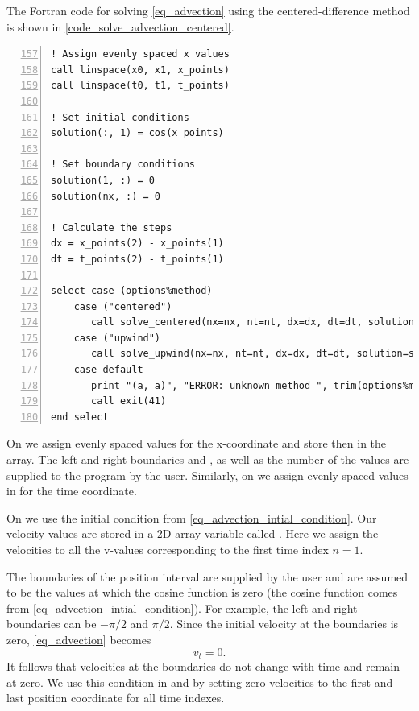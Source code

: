 The Fortran code for solving \autoref{eq_advection} using the centered-difference method is shown in \autoref{code_solve_advection_centered}.


\noindent\begin{minipage}{\linewidth}
\begin{lstlisting}[caption={Solving advection equation (\code{advection\_equation.f90}).},frame=tlrb,label={code_solve_advection_centered}, numbers=left, firstnumber=157]
! Assign evenly spaced x values
call linspace(x0, x1, x_points)
call linspace(t0, t1, t_points)

! Set initial conditions
solution(:, 1) = cos(x_points)

! Set boundary conditions
solution(1, :) = 0
solution(nx, :) = 0

! Calculate the steps
dx = x_points(2) - x_points(1)
dt = t_points(2) - t_points(1)

select case (options%method)
    case ("centered")
       call solve_centered(nx=nx, nt=nt, dx=dx, dt=dt, solution=solution)
    case ("upwind")
       call solve_upwind(nx=nx, nt=nt, dx=dx, dt=dt, solution=solution)
    case default
       print "(a, a)", "ERROR: unknown method ", trim(options%method)
       call exit(41)
end select
\end{lstlisting}
\end{minipage}

On  we assign evenly spaced values for the x-coordinate and store then in the  array. The left and right boundaries  and , as well as the number of the values  are supplied to the program by the user. Similarly, on  we assign evenly spaced values in  for the time coordinate.

On  we use the initial condition from \autoref{eq_advection_intial_condition}. Our velocity values are stored in a 2D array variable called . Here we assign the velocities to all the v-values corresponding to the first time index $n=1$.

The boundaries of the position interval are supplied by the user and are assumed to be the values at which the cosine function is zero (the cosine function comes from \autoref{eq_advection_intial_condition}). For example, the left and right boundaries can be $-\pi/2$ and $\pi/2$. Since the initial velocity at the boundaries is zero, \autoref{eq_advection} becomes
\[
  v_t = 0.
\]
It follows that velocities at the boundaries do not change with time and remain at zero. We use this condition in  and  by setting zero velocities to the first and last position coordinate for all time indexes.

